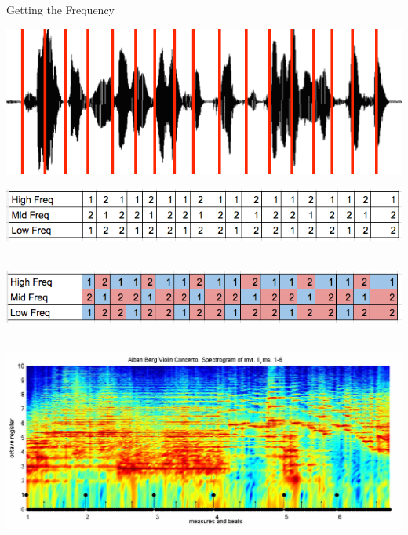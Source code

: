 \documentclass{beamer}
\begin{document}
\begin{frame}{Getting the Frequency} 
	\begin{center}
		\includegraphics[scale=0.5]{img/sound_sl}
		
		\includegraphics[scale=0.4]{img/hist}~~~~~~~~
		
		\includegraphics[scale=0.4]{img/histc}~~~~~~~~~
		
		\includegraphics[scale=0.3]{img/spect}~~~~~~~~~
	\end{center}
	
\end{frame}
\end{document}
